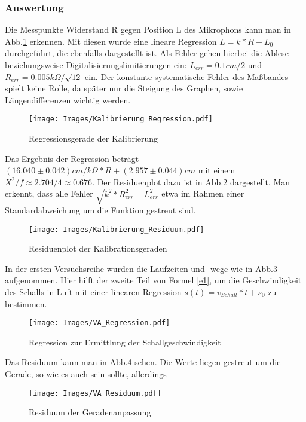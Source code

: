 \documentclass[]{article}
\begin{document}
	\subsubsection{Auswertung}
	
	Die Messpunkte Widerstand R gegen Position L des Mikrophons kann man in Abb.\ref{Kalib_Reg} erkennen. Mit diesen wurde eine lineare Regression $L=k*R+L_0$ durchgeführt, die ebenfalls dargestellt ist. Als Fehler gehen hierbei die Ablese- beziehungsweise Digitalisierungslimitierungen ein: $L_{err}=0.1cm/2$ und $R_{err}=0.005k\Omega/\sqrt{12}$ ein. Der konstante systematische Fehler des Maßbandes spielt keine Rolle, da später nur die Steigung des Graphen, sowie Längendifferenzen wichtig werden.
	
	\begin{figure}
	\begin{center}
		\texttt{[image: Images/Kalibrierung\_Regression.pdf]}
		\caption{Regressionsgerade der Kalibrierung}             
		\label{Kalib_Reg}               
	\end{center}            
	\end{figure}       
     
    Das Ergebnis der Regression beträgt $(16.040\pm0.042)cm/k\Omega*R+(2.957\pm0.044)cm$ mit einem $X^2/f \approx 2.704/4 \approx 0.676$. Der Residuenplot dazu ist in Abb.\ref{Kalib_Res} dargestellt. Man erkennt, dass alle Fehler $\sqrt{k^2*R_{err}^2+L_{err}^2}$ etwa im Rahmen einer Standardabweichung um die Funktion gestreut sind.\\                  
    
	\begin{figure}
	\begin{center}
		\texttt{[image: Images/Kalibrierung\_Residuum.pdf]}
		\caption{Residuenplot der Kalibrationsgeraden}
		\label{Kalib_Res}
	\end{center}
	\end{figure}

	In der ersten Versuchsreihe wurden die Laufzeiten und -wege wie in Abb.\ref{Va_Reg} aufgenommen. Hier hilft der zweite Teil von Formel \ref{e1}, um die Geschwindigkeit des Schalls in Luft mit einer linearen Regression $s(t)=v_{Schall}*t+s_0$ zu bestimmen. 
	
	\begin{figure}
	\begin{center}
		\texttt{[image: Images/VA\_Regression.pdf]}
		\caption{Regression zur Ermittlung der Schallgeschwindigkeit}
		\label{Va_Reg}
	\end{center}
	\end{figure}	
	Das Residuum kann man in Abb.\ref{Va_Res} sehen. Die Werte liegen gestreut um die Gerade, so wie es auch sein sollte, allerdings 
	\begin{figure}
	\begin{center}
		\texttt{[image: Images/VA\_Residuum.pdf]}
		\caption{Residuum der Geradenanpassung}
		\label{Va_Res}
	\end{center}
	\end{figure}	
\end{document}
